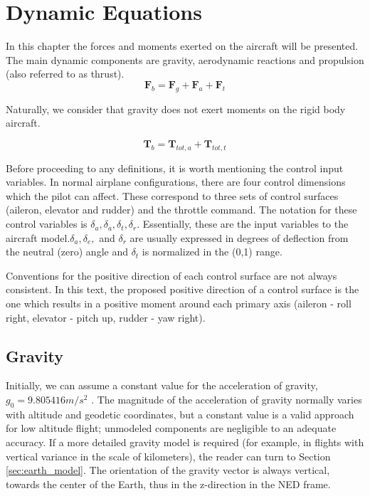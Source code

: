 \chapter{Dynamic Equations}

In this chapter the forces and moments exerted on the aircraft will be presented. The main dynamic components are gravity, aerodynamic reactions and propulsion (also referred to as thrust).
\begin{equation}
	\bm{F}_b = \bm{F}_g + \bm{F}_a + \bm{F}_t
\end{equation}

Naturally, we consider that gravity does not exert moments on the rigid body aircraft.

\begin{equation}
	\bm{T}_b = \bm{T}_{tot,a} + \bm{T}_{tot,t}
\end{equation}

Before proceeding to any definitions, it is worth mentioning the control input variables. In normal airplane configurations, there are four control dimensions which the pilot can affect. These correspond to three sets of control surfaces (aileron, elevator and rudder) and the throttle command. The notation for these control variables is $\delta_a, \delta_a, \delta_t, \delta_r$. Essentially, these are the input variables to the aircraft model.$\delta_a, \delta_e,$ and $\delta_r$ are usually expressed in degrees of deflection from the neutral (zero) angle and $\delta_t$ is normalized in the (0,1) range.

Conventions for the positive direction of each control surface are not always consistent. In this text, the proposed positive direction of a control surface is the one which results in a positive moment around each primary axis (aileron - roll right, elevator - pitch up, rudder - yaw right).

\section{Gravity}

Initially, we can assume a constant value for the acceleration of gravity, $g_0=9.805416m/s^2$ \cite[p.~8]{USStdAtm76}. The magnitude of the acceleration of gravity normally varies with altitude and geodetic coordinates, but a constant value is a valid approach for low altitude flight; unmodeled components are negligible to an adequate accuracy. If a more detailed gravity model is required (for example, in flights with vertical variance in the scale of kilometers), the reader can turn to Section \ref{sec:earth_model}. The orientation of the gravity vector is always vertical, towards the center of the Earth, thus in the z-direction in the NED frame.


